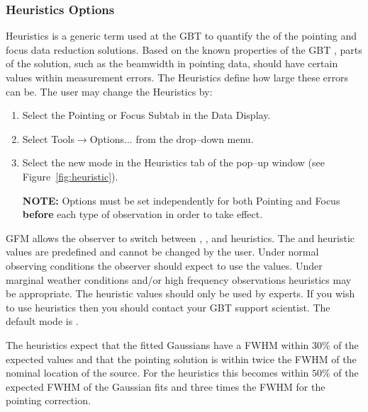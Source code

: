 \newpage

\subsubsection{Heuristics Options}\label{sec:heuristics}

Heuristics is a generic term used at the \gls{GBT} to quantify the  of
the pointing and focus data reduction solutions. Based on the known properties of the
\gls{GBT} , parts of the solution, such as the \gls{beamwidth} in pointing data, should
have certain values within measurement errors.  The Heuristics define how large these
errors can be. The user may change the Heuristics by: 

\begin{enumerate}[label=\bfseries{Step \arabic*.},leftmargin=*,
itemsep=0pt]
\item Select the Pointing or Focus Subtab in the Data Display.
\item Select {\btt Tools}$\rightarrow${\btt Options...} from the drop--down menu.
\item Select the new mode in the Heuristics tab of the pop--up window
(see Figure~\ref{fig:heuristic}).
\item[{\bf NOTE:}] Options must be set independently for both Pointing and Focus
{\bf before} each type of observation in order to take effect.
\end{enumerate}

\gls{GFM} allows the observer to switch between , , and
 heuristics.  The  and  heuristic values are
predefined and cannot be changed by the user.  Under normal observing conditions the
observer should expect to use the  values.  Under marginal weather
conditions and/or high frequency observations  heuristics may be appropriate.
The  heuristic values should only be used by experts.  If you wish to
use  heuristics then you should contact your \gls{GBT} support scientist.
The default mode is .

The  heuristics expect that the fitted Gaussians have a \gls{FWHM}
within $30\%$ of the expected values and that the pointing solution is within
twice the \gls{FWHM} of the nominal location of the source.  For the 
heuristics this becomes within $50\%$ of the expected \gls{FWHM} of the Gaussian
fits and three times the \gls{FWHM} for the pointing correction.

